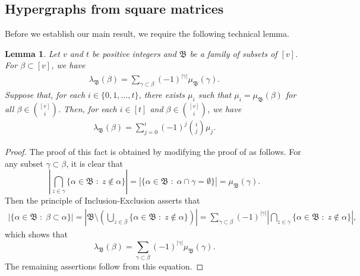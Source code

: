 \documentclass[11pt]{article}
\newtheorem{lemma}[theorem]{Lemma}
\begin{document}
\subsection{Hypergraphs from square matrices}
Before we establish our main result, we require the following technical lemma.

\begin{lemma}
    \label{lem:lambda}
        Let $v$ and $t$ be positive integers and $\mathfrak B$ be a family of subsets of $[v]$. 
    For $\beta\subset [v]$, we have
    \begin{align*}
\lambda_\mathfrak B(\beta)=\sum_{\gamma \subset \beta}(-1)^{|\gamma|} \mu_\mathfrak B(\gamma).
\end{align*}
Suppose that, for each $i \in \{0,1,\dots,t\}$, there exists $\mu_i$ such that $\mu_i = \mu_\mathfrak B(\beta)$ for all $\beta \in \binom{[v]}{i}$. 
Then, for each $i \in [t]$ and $\beta \in \binom{[v]}{i}$, we have
\begin{align*}
    \lambda_\mathfrak B(\beta)=\sum_{j=0}^i (-1)^j \binom{i}{j}\mu_j.
\end{align*}
\end{lemma}
\begin{proof}
The proof of this fact is obtained by modifying the proof of \cite[Theorem~9.7]{Stinson} as follows. 
For any subset $\gamma\subset \beta$, it is clear that 
$$
\left|\bigcap_{z\in \gamma}\{\alpha \in \mathfrak B  \; : \;  z\not\in \alpha\}\right|=\left|\{\alpha \in \mathfrak B  \; : \;  \alpha \cap \gamma=\emptyset\}\right|=\mu_\mathfrak B(\gamma).$$ 
Then the principle of Inclusion-Exclusion asserts that 
\begin{align*}
    |\{\alpha\in \mathfrak B  \; : \;  \beta\subset \alpha\}|
    =\left|\mathfrak B\setminus\left(\bigcup_{z\in \beta}\{\alpha \in \mathfrak B  \; : \;  z\not\in \alpha\}\right)\right|
    =\sum_{\gamma\subset \beta}(-1)^{|\gamma|}\left|\bigcap_{z\in \gamma}\{\alpha \in \mathfrak B  \; : \;  z\not\in \alpha\}\right|, 
\end{align*}
which shows that 
$$
\lambda_\mathfrak B(\beta)=\sum_{\gamma\subset \beta}(-1)^{|\gamma|} \mu_\mathfrak B(\gamma).
$$
The remaining assertions follow from this equation. 
\end{proof}
\end{document}
